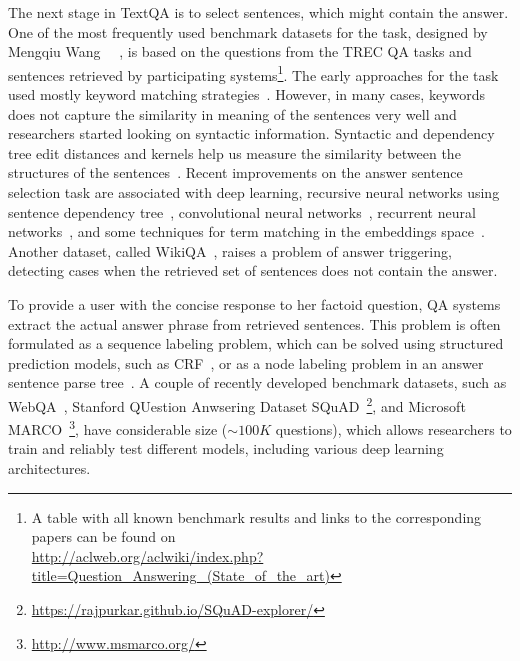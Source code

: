 The next stage in TextQA is to select sentences, which might contain the answer.
One of the most frequently used benchmark datasets for the task, designed by Mengqiu Wang ~\etal~\cite{wang2007jeopardy}, is based on the questions from the TREC QA tasks and sentences retrieved by participating systems\footnote{A table with all known benchmark results and links to the corresponding papers can be found on\\ \href{url}{http://aclweb.org/aclwiki/index.php?title=Question\_Answering\_(State\_of\_the\_art)}}.
The early approaches for the task used mostly keyword matching strategies~\cite{ittycheriah2001ibm,soubbotin2001patterns}.
However, in many cases, keywords does not capture the similarity in meaning of the sentences very well and researchers started looking on syntactic information.
Syntactic and dependency tree edit distances and kernels help us measure the similarity between the structures of the sentences~\cite{heilman2010tree,punyakanok2004mapping,shen2005exploring,wang2010probabilistic,yao2013answer}.
Recent improvements on the answer sentence selection task are associated with deep learning, \eg recursive neural networks using sentence dependency tree~\cite{iyyer2014neural}, convolutional neural networks~\cite{yu2014deep,santos2016attentive}, recurrent neural networks~\cite{tan2015lstm,WangN15}, and some techniques for term matching in the embeddings space~\cite{he2016pairwise,wang2017bilateral,yang2016anmm}.
Another dataset, called WikiQA~\cite{yang2015wikiqa}, raises a problem of answer triggering, \ie detecting cases when the retrieved set of sentences does not contain the answer.

To provide a user with the concise response to her factoid question, QA systems extract the actual answer phrase from retrieved sentences.
This problem is often formulated as a sequence labeling problem, which can be solved using structured prediction models, such as CRF~\cite{yao2013answer}, or as a node labeling problem in an answer sentence parse tree~\cite{malon2013answer}.
A couple of recently developed benchmark datasets, such as WebQA~\cite{li2016dataset}, Stanford QUestion Anwsering Dataset SQuAD~\cite{rajpurkar2016squad}\footnote{\href{url}{https://rajpurkar.github.io/SQuAD-explorer/}}, and Microsoft MARCO~\cite{nguyen2016ms}\footnote{\href{url}{http://www.msmarco.org/}}, have considerable size ($\sim100K$ questions), which allows researchers to train and reliably test different models, including various deep learning architectures.

